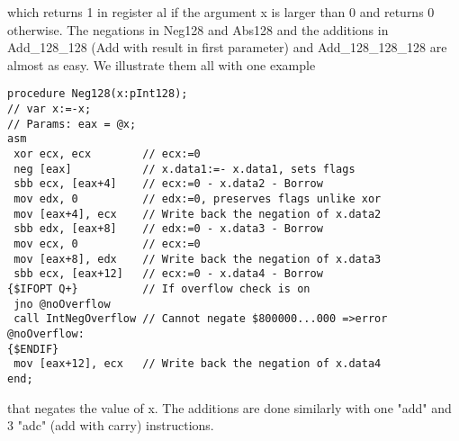 \noindent
which returns 1 in register al if the argument x is larger than 0 and returns 0 otherwise.
The negations in Neg128 and Abs128 and the additions in Add\_128\_128 (Add with result in first parameter) and Add\_128\_128\_128 are almost as easy. We illustrate them all with one example 
{\tiny
\begin{verbatim}
procedure Neg128(x:pInt128);
// var x:=-x;
// Params: eax = @x;
asm
 xor ecx, ecx        // ecx:=0
 neg [eax]           // x.data1:=- x.data1, sets flags
 sbb ecx, [eax+4]    // ecx:=0 - x.data2 - Borrow
 mov edx, 0          // edx:=0, preserves flags unlike xor
 mov [eax+4], ecx    // Write back the negation of x.data2
 sbb edx, [eax+8]    // edx:=0 - x.data3 - Borrow
 mov ecx, 0          // ecx:=0
 mov [eax+8], edx    // Write back the negation of x.data3
 sbb ecx, [eax+12]   // ecx:=0 - x.data4 - Borrow
{$IFOPT Q+}          // If overflow check is on
 jno @noOverflow
 call IntNegOverflow // Cannot negate $800000...000 =>error
@noOverflow:
{$ENDIF}
 mov [eax+12], ecx   // Write back the negation of x.data4
end;
\end{verbatim}
}
\noindent
that negates the value of x. The additions are done similarly with one "add" and 3 "adc" (add with carry) instructions.

